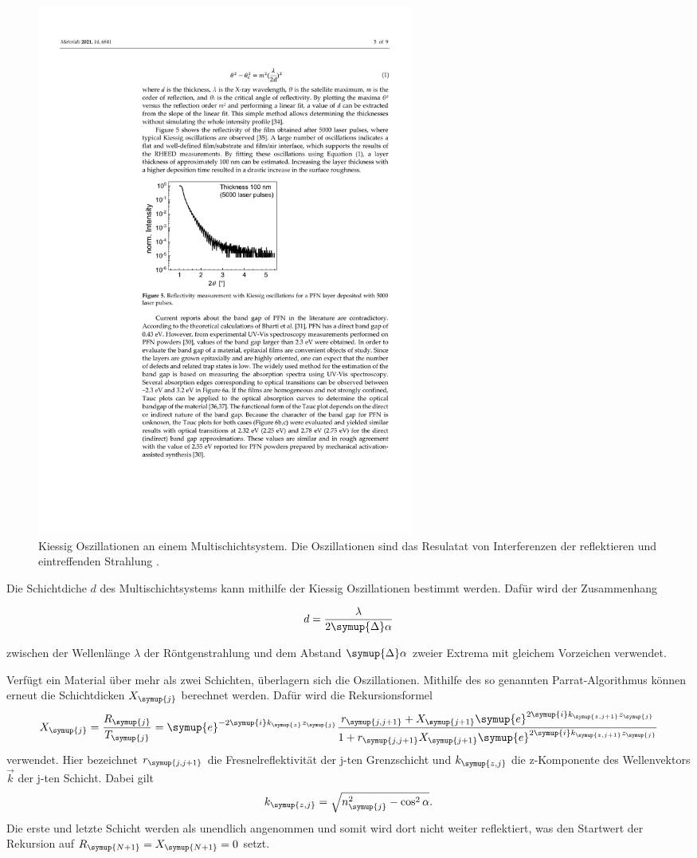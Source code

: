 \begin{figure}
    \centering
    \includegraphics[width=0.6\textwidth]{content/pics/kiessig_oscillation.pdf}
    \caption{Kiessig Oszillationen an einem Multischichtsystem. Die Oszillationen sind das Resulatat von Interferenzen der reflektieren und eintreffenden %
    Strahlung \cite{kiessig_oscillation}.}
    \label{fig:kiessig_oscillation}
\end{figure}

Die Schichtdiche $d$ des Multischichtsystems kann mithilfe der Kiessig Oszillationen bestimmt werden. Dafür wird der Zusammenhang

\begin{equation}
    d = \frac{\lambda}{2\symup{\Delta}\alpha}
    \label{eq:Schichtdicke}
\end{equation}

zwischen der Wellenlänge $\lambda$ der Röntgenstrahlung und dem Abstand $\symup{\Delta}\alpha$ zweier Extrema mit gleichem Vorzeichen verwendet.

Verfügt ein Material über mehr als zwei Schichten, überlagern sich die Oszillationen. Mithilfe des so genannten Parrat-Algorithmus können erneut die Schichtdicken $X_{\symup{j}}$ berechnet werden.
Dafür wird die Rekursionsformel
\begin{equation}
    X_{\symup{j}} = \frac{R_{\symup{j}}}{T_{\symup{j}}} = \symup{e}^{-2\symup{i}k_{\symup{z}}z_{\symup{j}}}\frac{r_{\symup{j,j+1}}+X_{\symup{j+1}}\symup{e}^{2\symup{i}k_{\symup{z,j+1}}z_{\symup{j}}}}%
    {1+r_{\symup{j,j+1}}X_{\symup{j+1}}\symup{e}^{2\symup{i}k_{\symup{z,j+1}}z_{\symup{j}}}} %
    \label{eq:Parrat}
\end{equation}
verwendet. Hier bezeichnet $r_{\symup{j,j+1}}$ die Fresnelreflektivität der j-ten Grenzschicht und $k_{\symup{z,j}}$ die z-Komponente des Wellenvektors $\vec{k}$ der j-ten Schicht.
Dabei gilt
\begin{equation*}
    k_{\symup{z,j}} = \sqrt{n_{\symup{j}}^2 -\cos^2 \alpha}.
\end{equation*}
Die erste und letzte Schicht werden als unendlich angenommen und somit wird dort nicht weiter reflektiert, was den Startwert der Rekursion auf $R_{\symup{N+1}} = X_{\symup{N+1}} = 0$ setzt.

